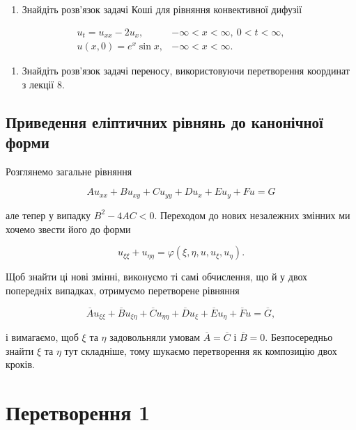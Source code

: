 \documentclass[
  ukrainian,
]{article}
\providecommand{\tightlist}{%
  \setlength{\itemsep}{0pt}\setlength{\parskip}{0pt}}
\begin{document}
\begin{enumerate}
\def\labelenumi{\arabic{enumi}.}
\setcounter{enumi}{1}
\tightlist
\item
  Знайдіть розв'язок задачі Коші для рівняння конвективної дифузії
\end{enumerate}

\[
\begin{array}{ll} u_t = u_{xx} - 2u_x, & -\infty < x < \infty, \ 0 < t < \infty, \\ u(x, 0) = e^x \sin x, & -\infty < x < \infty. \end{array}
\]

\begin{enumerate}
\def\labelenumi{\arabic{enumi}.}
\setcounter{enumi}{2}
\tightlist
\item
  Знайдіть розв'язок задачі переносу, використовуючи перетворення
  координат з лекції 8.
\end{enumerate}

\subsection{Приведення еліптичних рівнянь до канонічної
форми}\label{ux43fux440ux438ux432ux435ux434ux435ux43dux43dux44f-ux435ux43bux456ux43fux442ux438ux447ux43dux438ux445-ux440ux456ux432ux43dux44fux43dux44c-ux434ux43e-ux43aux430ux43dux43eux43dux456ux447ux43dux43eux457-ux444ux43eux440ux43cux438}

Розглянемо загальне рівняння

\[
Au_{xx} + Bu_{xy} + Cu_{yy} + Du_x + Eu_y + Fu = G
\]

але тепер у випадку \(B^2 - 4AC < 0\). Переходом до нових незалежних
змінних ми хочемо звести його до форми

\[
u_{\xi\xi} + u_{\eta\eta} = \varphi(\xi, \eta, u, u_{\xi}, u_{\eta}).
\]

Щоб знайти ці нові змінні, виконуємо ті самі обчислення, що й у двох
попередніх випадках, отримуємо перетворене рівняння

\[
\overline{A}u_{\xi\xi} + \overline{B}u_{\xi\eta} + \overline{C}u_{\eta\eta} + \overline{D}u_{\xi} + \overline{E}u_{\eta} + \overline{F}u = \overline{G},
\]

і вимагаємо, щоб \(\xi\) та \(\eta\) задовольняли умовам
\(\overline{A} = \overline{C}\) і \(\overline{B} = 0\). Безпосередньо
знайти \(\xi\) та \(\eta\) тут складніше, тому шукаємо перетворення як
композицію двох кроків.

\section{Перетворення
1}\label{ux43fux435ux440ux435ux442ux432ux43eux440ux435ux43dux43dux44f-1}
\end{document}
